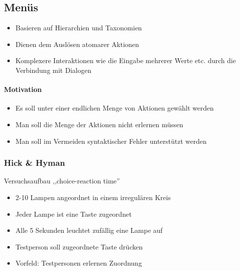 \documentclass
[
	8pt,		%
	ngerman,	%
	a4paper,	%
	landscape,	%
	final		%
]{extarticle}
\begin{document}
\begin{multicols*}{4}
	\subsection{Menüs}
	\begin{itemize}
		\item Basieren auf Hierarchien und Taxonomien
		\item Dienen dem Auslösen atomarer Aktionen
		\item Komplexere Interaktionen wie die Eingabe mehrerer Werte etc.
		      durch die Verbindung mit Dialogen
	\end{itemize}
	\paragraph{Motivation}
	\begin{itemize}
		\item Es soll unter einer endlichen Menge von Aktionen gewählt werden
		\item Man soll die Menge der Aktionen nicht erlernen müssen
		\item Man soll im Vermeiden syntaktischer Fehler unterstützt werden
	\end{itemize}
	\subsubsection{Hick \& Hyman}
	Versuchsaufbau ,,choice-reaction time''
	\begin{itemize}
		\item 2-10 Lampen angeordnet in einem irregulären Kreis
		\item Jeder Lampe ist eine Taste zugeordnet
		\item Alle 5 Sekunden leuchtet zufällig eine Lampe auf
		\item Testperson soll zugeordnete Taste drücken
		\item Vorfeld: Testpersonen erlernen Zuordnung
	\end{itemize}

\end{multicols*}
\end{document}
